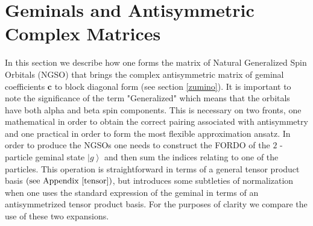 \documentclass[aps,preprint]{revtex4}%
\begin{document}
\section{Geminals and Antisymmetric Complex Matrices\label{geminal}}

In this section we describe how one forms the matrix of Natural Generalized
Spin Orbitals (NGSO) that brings the complex antisymmetric matrix of geminal
coefficients $\mathbf{c}$\textbf{ }to block diagonal form (see section
\ref{zumino}). It is important to note the significance of the term
"Generalized" which means that the orbitals have both alpha and beta spin
components. This is necessary on two fronts, one mathematical in order to
obtain the correct pairing associated with antisymmetry and one practical in
order to form the most flexible approximation ansatz. In order to produce the
NGSOs one needs to construct the FORDO of the $2$ -particle geminal state
$\left\vert g\right\rangle $ and then sum the indices relating to one of the
particles.\textbf{ }This operation is straightforward in terms of a general
tensor product basis $\left(  \text{see Appendix \ref{tensor}}\right)  $, but
introduces some subtleties of normalization when one uses the standard
expression of the geminal in terms of an antisymmetrized tensor product basis.
For the purposes of clarity we compare the use of these two expansions.
\end{document}
